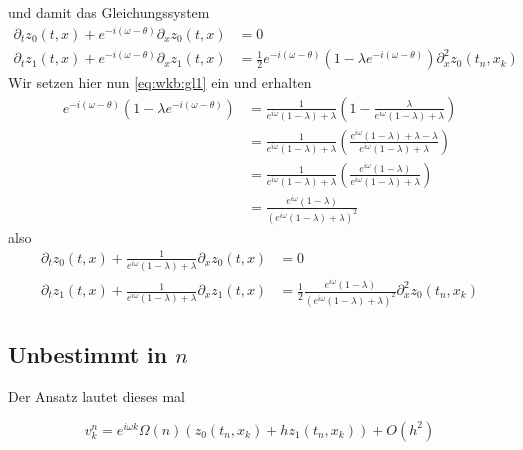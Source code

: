 und damit das Gleichungssystem
{\small
\begin{align}
\partial_t z_0(t,x) + e^{-i (\omega - \theta)} \partial_x z_0(t,x) &= 0\\
\partial_t z_1(t,x) + e^{-i (\omega - \theta)} \partial_x z_1(t,x) &= \frac{1}{2} e^{- i(\omega - \theta)} \left(1 - \lambda e^{-i(\omega - \theta)} \right) \partial^2_x z_0(t_n, x_k)
\end{align}}
Wir setzen hier nun \eqref{eq:wkb:gl1} ein und erhalten
\begin{align*}
e^{- i(\omega - \theta)} \left(1 - \lambda e^{-i(\omega - \theta)} \right) &= \frac{1}{ e^{i \omega} (1 -  \lambda) + \lambda } \left( 1 - \frac{\lambda}{ e^{i \omega} (1 -  \lambda) + \lambda } \right)\\
&= \frac{1}{ e^{i \omega} (1 -  \lambda) + \lambda } \left( \frac{e^{i \omega} (1 -  \lambda) + \lambda - \lambda}{ e^{i \omega} (1 -  \lambda) + \lambda } \right)\\
&= \frac{1}{ e^{i \omega} (1 -  \lambda) + \lambda } \left( \frac{e^{i \omega} (1 -  \lambda) }{ e^{i \omega} (1 -  \lambda) + \lambda } \right)\\
&= \frac{e^{i \omega} (1 -  \lambda) }{ \left(e^{i \omega} (1 -  \lambda) + \lambda \right)^2 }
\end{align*}
also
{\small
\begin{align}
\partial_t z_0(t,x) + \frac{1}{ e^{i \omega} (1 -  \lambda) + \lambda } \partial_x z_0(t,x) &= 0\\
\partial_t z_1(t,x) + \frac{1}{ e^{i \omega} (1 -  \lambda) + \lambda } \partial_x z_1(t,x) &= \frac{1}{2} \frac{e^{i \omega} (1 -  \lambda) }{ \left(e^{i \omega} (1 -  \lambda) + \lambda \right)^2 } \partial^2_x z_0(t_n, x_k)
\end{align}}


\subsection*{Unbestimmt in $n$}

Der Ansatz lautet dieses mal 

\[ v^n_k = e^{i \omega k} \Omega(n) \left( z_0(t_n, x_k) + h z_1(t_n, x_k) \right) + O(h^2) \]


